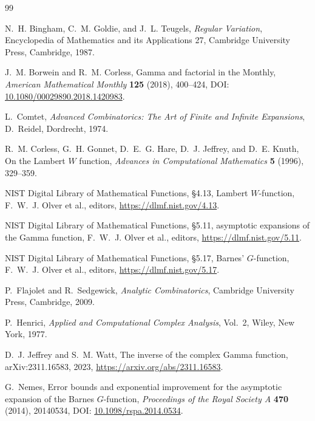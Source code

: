 \documentclass[11pt,a4paper]{article}
\numberwithin{equation}{section}
\theoremstyle{definition}
\theoremstyle{remark}
\begin{document}
\begin{thebibliography}{99}

N.~H. Bingham, C.~M. Goldie, and J.~L. Teugels,
\newblock \emph{Regular Variation},
\newblock Encyclopedia of Mathematics and its Applications 27,
Cambridge University Press, Cambridge, 1987.

J.~M. Borwein and R.~M. Corless,
\newblock Gamma and factorial in the Monthly,
\newblock \emph{American Mathematical Monthly} \textbf{125} (2018),
400--424,
\newblock DOI: \href{https://doi.org/10.1080/00029890.2018.1420983}
{10.1080/00029890.2018.1420983}.

L.~Comtet,
\newblock \emph{Advanced Combinatorics: The Art of Finite and Infinite
Expansions},
\newblock D.~Reidel, Dordrecht, 1974.

R.~M. Corless, G.~H. Gonnet, D.~E.~G. Hare, D.~J. Jeffrey, and D.~E. Knuth,
\newblock On the Lambert \(W\) function,
\newblock \emph{Advances in Computational Mathematics} \textbf{5} (1996),
329--359.

NIST Digital Library of Mathematical Functions,
\newblock \S4.13, Lambert \(W\)-function,
\newblock F.~W.~J. Olver et al., editors,
\newblock \url{https://dlmf.nist.gov/4.13}.

NIST Digital Library of Mathematical Functions,
\newblock \S5.11, asymptotic expansions of the Gamma function,
\newblock F.~W.~J. Olver et al., editors,
\newblock \url{https://dlmf.nist.gov/5.11}.

NIST Digital Library of Mathematical Functions,
\newblock \S5.17, Barnes' \(G\)-function,
\newblock F.~W.~J. Olver et al., editors,
\newblock \url{https://dlmf.nist.gov/5.17}.

P.~Flajolet and R.~Sedgewick,
\newblock \emph{Analytic Combinatorics},
\newblock Cambridge University Press, Cambridge, 2009.

P.~Henrici,
\newblock \emph{Applied and Computational Complex Analysis}, Vol.~2,
\newblock Wiley, New York, 1977.

D.~J. Jeffrey and S.~M. Watt,
\newblock The inverse of the complex Gamma function,
\newblock arXiv:2311.16583, 2023,
\newblock \url{https://arxiv.org/abs/2311.16583}.

G.~Nemes,
\newblock Error bounds and exponential improvement for the asymptotic
expansion of the Barnes \(G\)-function,
\newblock \emph{Proceedings of the Royal Society A} \textbf{470} (2014),
20140534,
\newblock DOI: \href{https://doi.org/10.1098/rspa.2014.0534}
{10.1098/rspa.2014.0534}.


\end{thebibliography}
\end{document}
